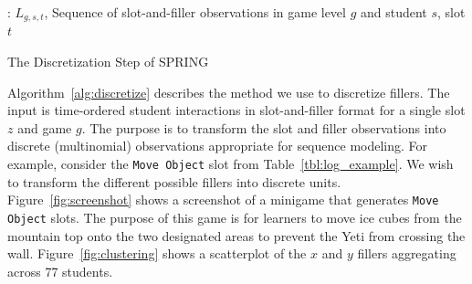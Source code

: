 \documentclass{sigchi}
\def\algname{SPRING\xspace}
\begin{document}
	\begin{algorithm}[ht]
		\begin{algorithmic}[1]
			\Require: $L_{g,s,t}$, Sequence of slot-and-filler observations in game level $g$ and student $s$, slot $t$
			
			
			\State
			\EndIf
			\EndFor
			\EndFor
			\State {}
			\EndProcedure
			
		\end{algorithmic}
		\caption{The Discretization Step of \algname \label{alg:discretize}}
	\end{algorithm}
	
	
	Algorithm~\ref{alg:discretize} describes the method we use to discretize fillers.
	The input is time-ordered student interactions in slot-and-filler format for a single slot $z$ and game $g$.
	The purpose is to transform the slot and filler observations into  discrete (multinomial) observations appropriate for sequence modeling.
	For example, consider the \texttt{Move Object} slot from Table~\ref{tbl:log_example}.
	We wish to transform the different possible fillers into discrete units.
	Figure~\ref{fig:screenshot} shows a screenshot of a minigame that generates  \texttt{Move Object} slots.
	The purpose of this game is for learners to move ice cubes from the mountain top onto the two designated areas to prevent the Yeti from crossing the wall.
	Figure~\ref{fig:clustering} shows a scatterplot of the $x$ and $y$ fillers aggregating across 77 students.
	
\end{document}
